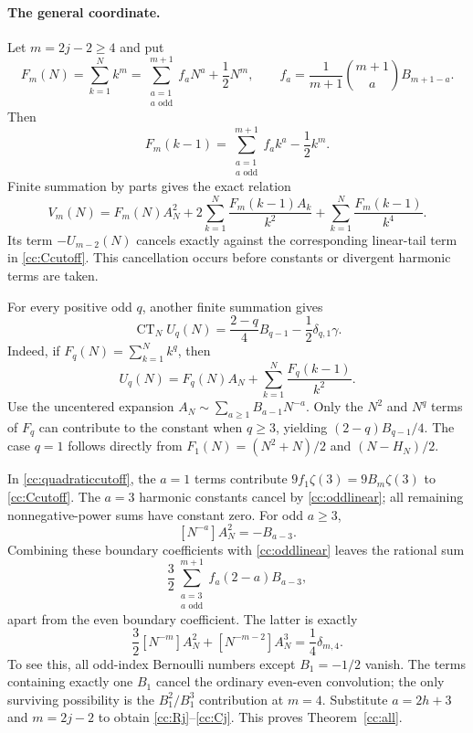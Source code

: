 \documentclass[11pt,letterpaper]{article}
\theoremstyle{definition}
\theoremstyle{remark}
\numberwithin{equation}{section}
\begin{document}
\paragraph{The general coordinate.}
Let $m=2j-2\ge4$ and put
\[
 F_m(N)=\sum_{k=1}^Nk^m
 =\sum_{\substack{a=1\\a\text{ odd}}}^{m+1}f_aN^a+\frac12N^m,
 \qquad
 f_a=\frac1{m+1}\binom{m+1}{a}B_{m+1-a}.
\]
Then
\[
 F_m(k-1)=\sum_{\substack{a=1\\a\text{ odd}}}^{m+1}f_ak^a-\frac12k^m.
\]
Finite summation by parts gives the exact relation
\begin{equation}\label{cc:quadraticcutoff}
 V_m(N)=F_m(N)A_N^2+
 2\sum_{k=1}^N\frac{F_m(k-1)A_k}{k^2}
 +\sum_{k=1}^N\frac{F_m(k-1)}{k^4}.
\end{equation}
Its term $-U_{m-2}(N)$ cancels exactly against the corresponding
linear-tail term in \eqref{cc:Ccutoff}.  This cancellation occurs
before constants or divergent harmonic terms are taken.

For every positive odd $q$, another finite summation gives
\begin{equation}\label{cc:oddlinear}
 \operatorname{CT}_NU_q(N)
   =\frac{2-q}{4}B_{q-1}-\frac12\delta_{q,1}\gamma.
\end{equation}
Indeed, if $F_q(N)=\sum_{k=1}^Nk^q$, then
\[
 U_q(N)=F_q(N)A_N+\sum_{k=1}^N\frac{F_q(k-1)}{k^2}.
\]
Use the uncentered expansion
$A_N\sim\sum_{a\ge1}B_{a-1}N^{-a}$.
Only the $N^2$ and $N^q$ terms of $F_q$ can contribute to the
constant when $q\ge3$, yielding $(2-q)B_{q-1}/4$.
The case $q=1$ follows directly from
$F_1(N)=(N^2+N)/2$ and $(N-H_N)/2$.

In \eqref{cc:quadraticcutoff}, the $a=1$ terms contribute
$9f_1\zeta(3)=9B_m\zeta(3)$ to \eqref{cc:Ccutoff}.
The $a=3$ harmonic constants cancel by \eqref{cc:oddlinear}; all
remaining nonnegative-power sums have constant zero.
For odd $a\ge3$,
\[
 [N^{-a}]A_N^2=-B_{a-3}.
\]
Combining these boundary coefficients with \eqref{cc:oddlinear}
leaves the rational sum
\[
 \frac32\sum_{\substack{a=3\\a\text{ odd}}}^{m+1}
          f_a(2-a)B_{a-3},
\]
apart from the even boundary coefficient.  The latter is exactly
\begin{equation}\label{cc:boundaryexception}
 \frac32[N^{-m}]A_N^2+[N^{-m-2}]A_N^3
       =\frac14\delta_{m,4}.
\end{equation}
To see this, all odd-index Bernoulli numbers except $B_1=-1/2$
vanish.  The terms containing exactly one $B_1$ cancel the ordinary
even-even convolution; the only surviving possibility is the
$B_1^2/B_1^3$ contribution at $m=4$.
Substitute $a=2h+3$ and $m=2j-2$ to obtain
\eqref{cc:Rj}--\eqref{cc:Cj}.  This proves
Theorem~\ref{cc:all}.
\end{document}
